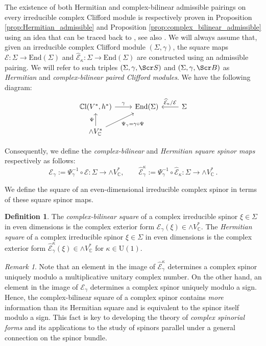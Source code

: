 \documentclass[10pt,a4paper,twoside,reqno]{amsart}
\theoremstyle{plain}
\theoremstyle{definition}
\newtheorem{definition}[thm]{Definition}
\theoremstyle{remark}
\newtheorem{remark}[thm]{Remark}
\newcommand{\End}{\mathrm{End}}
\def\C{\mathbb{C}}
\def\scB{\Scr B}
\def\scS{\Scr S}
\def\U{\mathrm{U}}
\def\cE{\mathcal{E}}
\def\hcE{\widehat{\mathcal{E}}}
\begin{document}
\noindent
The existence of both Hermitian and complex-bilinear admissible pairings on every irreducible complex Clifford module is respectively proven in Proposition \ref{prop:Hermitian_admissible} and Proposition \ref{prop:complex_bilinear_admissible} using an idea that can be traced back to \cite{Baum81}, see also \cite{HarveyBook}. We will always assume that, given an irreducible complex Clifford module $(\Sigma,\gamma)$, the square maps $\cE\colon\Sigma\to\End(\Sigma)$ and $\hcE_\kappa\colon\Sigma\to\End(\Sigma)$ are constructed using an admissible pairing. We will refer to such triples $(\Sigma, \gamma ,\scS)$ and $(\Sigma, \gamma ,\scB)$ as \emph{Hermitian} and \emph{complex-bilinear paired Clifford modules}. We have the following diagram: 
\begin{equation*}
\begin{tikzcd}
{\mathbb{C}\mathrm{l}(V^*,h^*)} \arrow[r, "\gamma"]  & \mathrm{End}(\Sigma) & \Sigma \arrow[l, " \widehat{\mathcal{E}}_\kappa / \mathcal{E}"'] \\
\wedge V^*_{\mathbb{C}} \arrow[u, "\Psi"] \arrow[ru, "\Psi_\gamma=\gamma\circ\Psi"'] &                      &             
\end{tikzcd}
\end{equation*}

\noindent
Consequently, we define the \emph{complex-bilinear} and \emph{Hermitian square spinor maps} respectively as follows:
\begin{equation*}
\cE_\gamma:=\Psi_\gamma^{-1}\circ\cE\colon\Sigma\to\wedge V^*_\C,\qquad \hcE_\gamma^\kappa:=\Psi_\gamma^{-1}\circ\hcE_\kappa\colon\Sigma\to\wedge V^*_\C\, .
\end{equation*}

\noindent
We define the square of an even-dimensional irreducible complex spinor in terms of these square spinor maps. 

\begin{definition}
\label{def:squares}
The \emph{complex-bilinear square} of a complex irreducible spinor $\xi \in \Sigma$ in even dimensions is the complex exterior form $\cE_\gamma(\xi)\in \wedge V^*_{\mathbb{C}}$. The \emph{Hermitian square} of a complex irreducible spinor $\xi \in \Sigma$ in even dimensions is the complex exterior form $\hcE_\gamma^\kappa(\xi)\in \wedge V^*_{\mathbb{C}}$ for $\kappa\in\U(1)$.
\end{definition}

\begin{remark}
Note that an element in the image of $\hcE_\gamma^\kappa$ determines a complex spinor uniquely modulo a multiplicative unitary complex number. On the other hand, an element in the image of $\cE_\gamma$ determines a complex spinor uniquely modulo a sign. Hence, the complex-bilinear square of a complex spinor contains \emph{more} information than its Hermitian square and is equivalent to the spinor itself modulo a sign. This fact is key to developing the theory of \emph{complex spinorial forms} and its applications to the study of spinors parallel under a general connection on the spinor bundle.
\end{remark}
\end{document}
